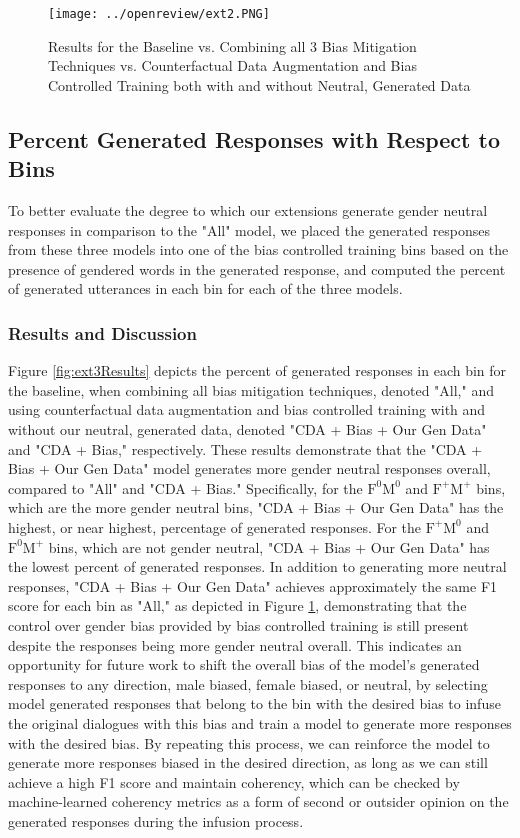 \begin{figure}[h!]
    \centering
    \texttt{[image: ../openreview/ext2.PNG]}
    \caption{Results for the Baseline vs. Combining all 3 Bias Mitigation Techniques vs. Counterfactual Data Augmentation and Bias Controlled Training both with and without Neutral, Generated Data}
    \label{fig:ext2Results}
\end{figure}

\subsection{Percent Generated Responses with Respect to Bins}
To better evaluate the degree to which our extensions generate gender neutral responses in comparison to the "All" model, we placed the generated responses from these three models into one of the bias controlled training bins based on the presence of gendered words in the generated response, and computed the percent of generated utterances in each bin for each of the three models.

\subsubsection{Results and Discussion}
Figure \ref{fig:ext3Results} depicts the percent of generated responses in each bin for the baseline, when combining all bias mitigation techniques, denoted "All," and using counterfactual data augmentation and bias controlled training with and without our neutral, generated data, denoted "CDA + Bias + Our Gen Data" and "CDA + Bias," respectively. These results demonstrate that the "CDA + Bias + Our Gen Data" model generates more gender neutral responses overall, compared to "All" and "CDA + Bias." Specifically, for the $\mathrm{F}^0\mathrm{M}^0$ and $\mathrm{F}^+\mathrm{M}^+$ bins, which are the more gender neutral bins, "CDA + Bias + Our Gen Data" has the highest, or near highest, percentage of generated responses. For the $\mathrm{F}^+\mathrm{M}^0$ and $\mathrm{F}^0\mathrm{M}^+$ bins, which are not gender neutral, "CDA + Bias + Our Gen Data" has the lowest percent of generated responses. In addition to generating more neutral responses, "CDA + Bias + Our Gen Data" achieves approximately the same F1 score for each bin as "All," as depicted in Figure \ref{fig:ext2Results}, demonstrating that the control over gender bias provided by bias controlled training is still present despite the responses being more gender neutral overall. This indicates an opportunity for future work to shift the overall bias of the model’s generated responses to any direction, male biased, female biased, or neutral, by selecting model generated responses that belong to the bin with the desired bias to infuse the original dialogues with this bias and train a model to generate more responses with the desired bias. By repeating this process, we can reinforce the model to generate more responses biased in the desired direction, as long as we can still achieve a high F1 score and maintain coherency, which can be checked by machine-learned coherency metrics \supercite{celikyilmaz2020evaluation} as a form of second or outsider opinion on the generated responses during the infusion process.

